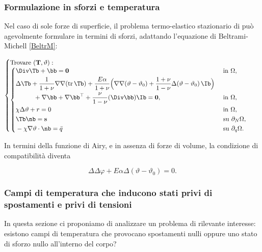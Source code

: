 \subsubsection{Formulazione in sforzi e temperatura}
Nel caso di sole forze di superficie, il problema termo-elastico stazionario di può agevolmente formulare in termini di sforzi, adattando l'equazione di Beltrami-Michell \eqref{BeltrM}:
 \begin{definition}
	\begin{equation}\label{thst}
		\begin{cases}
			\mathrm{Trovare~}(\mathbf{T},\vartheta):\\
			\begin{cases}
				\begin{aligned}
					&\Div\Tb +\bb=\mathbf{0} \quad &&\mathrm{~in~}\Omega,\\
					&\Delta \Tb +\frac{1}{1+\nu}\nabla \nabla (\operatorname{tr}\Tb)+\frac{E\alpha}{1+\nu}\Big( \nabla\nabla(\vartheta-\vartheta_0)+\frac{1+\nu}{1-\nu}\Delta(\vartheta-\vartheta_0)\,\Ib \Big)\\
					&\hspace{1cm}+\nabla \bb+\nabla \bb^\top+\frac{\nu}{1-\nu}(\Div \bb) \Ib =\mathbf{0}, \quad &&\mathrm{~in~}\Omega,\\
			&\chi\Delta \vartheta+r=0  \quad &&\mathrm{~in~}\Omega,\\
					&\Tb \nb=\mathbf{s} &&\mathrm{~su~}\partial_N\Omega,\\
					&-\chi\nabla\vartheta\cdot \nb=\bar{q}&&\mathrm{~su~}\partial_q\Omega.
				\end{aligned}
			\end{cases}
		\end{cases}
	\end{equation}
\end{definition}

In termini della funzione di Airy, e in assenza di forze di volume, la condizione di compatibilità diventa
\begin{definition}
\begin{equation}\label{airythe}
\Delta \Delta \varphi+E\alpha\Delta (\vartheta-\vartheta_0)=0.
\end{equation}
\end{definition}

\vspace{.5cm}
\subsubsection{Campi di temperatura che inducono stati privi di spostamenti e privi di tensioni}
In questa sezione ci proponiamo di analizzare un problema di rilevante interesse: esistono  campi di temperatura che provocano spostamenti nulli oppure uno stato di sforzo nullo all'interno del corpo?

